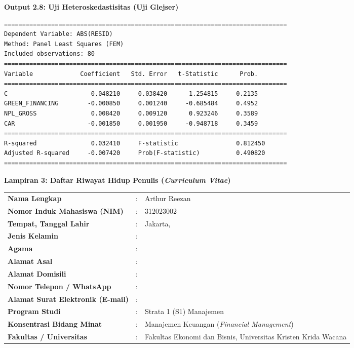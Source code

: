 \documentclass[12pt,a4paper]{article}
\newcommand{\nahamahasiswa}{Arthur Reezan}
\newcommand{\nim}{312023002}
\numberwithin{equation}{section}
\begin{document}
\vspace{0.4cm}
\noindent \textbf{Output 2.8: Uji Heteroskedastisitas (Uji Glejser)}
\begin{verbatim}
==============================================================================
Dependent Variable: ABS(RESID)
Method: Panel Least Squares (FEM)
Included observations: 80
==============================================================================
Variable             Coefficient   Std. Error   t-Statistic      Prob.
==============================================================================
C                       0.048210     0.038420      1.254815     0.2135
GREEN_FINANCING        -0.000850     0.001240     -0.685484     0.4952
NPL_GROSS               0.008420     0.009120      0.923246     0.3589
CAR                    -0.001850     0.001950     -0.948718     0.3459
==============================================================================
R-squared               0.032410     F-statistic                0.812450
Adjusted R-squared     -0.007420     Prob(F-statistic)          0.490820
==============================================================================
\end{verbatim}

\vspace{0.8cm}
\noindent \textbf{Lampiran 3: Daftar Riwayat Hidup Penulis (\emph{Curriculum Vitae})}

\vspace{0.4cm}
\noindent
\begin{tabular}{lll}
  \textbf{Nama Lengkap} & : & \nahamahasiswa \\
  \textbf{Nomor Induk Mahasiswa (NIM)} & : & \nim \\
  \textbf{Tempat, Tanggal Lahir} & : & Jakarta, \underline{\hspace{4cm}} \\
  \textbf{Jenis Kelamin} & : & \underline{\hspace{4cm}} \\
  \textbf{Agama} & : & \underline{\hspace{4cm}} \\
  \textbf{Alamat Asal} & : & \underline{\hspace{7cm}} \\
  \textbf{Alamat Domisili} & : & \underline{\hspace{7cm}} \\
  \textbf{Nomor Telepon / WhatsApp} & : & \underline{\hspace{5cm}} \\
  \textbf{Alamat Surat Elektronik (E-mail)} & : & \underline{\hspace{7cm}} \\
  \textbf{Program Studi} & : & Strata 1 (S1) Manajemen \\
  \textbf{Konsentrasi Bidang Minat} & : & Manajemen Keuangan (\emph{Financial Management}) \\
  \textbf{Fakultas / Universitas} & : & Fakultas Ekonomi dan Bisnis, Universitas Kristen Krida Wacana \\
\end{tabular}
\end{document}

